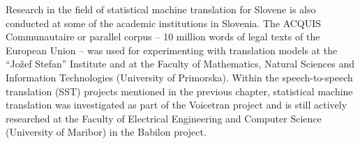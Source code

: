 \begin{multicols}{2}

Research in the field of statistical machine translation for Slovene is also conducted at some of the academic institutions in Slovenia. The ACQUIS Communautaire \cite{ET1} or parallel corpus – 10 million words of legal texts of the European Union – was used for experimenting with translation models at the “Jožef Stefan” Institute and at the Faculty of Mathematics, Natural Sciences and Information Technologies (University of Primorska). Within the speech-to-speech translation (SST) projects mentioned in the previous chapter, statistical machine translation was investigated as part of the Voicetran project and is still actively researched at the Faculty of Electrical Engineering and Computer Science (University of Maribor) in the Babilon project. 


\end{multicols}
